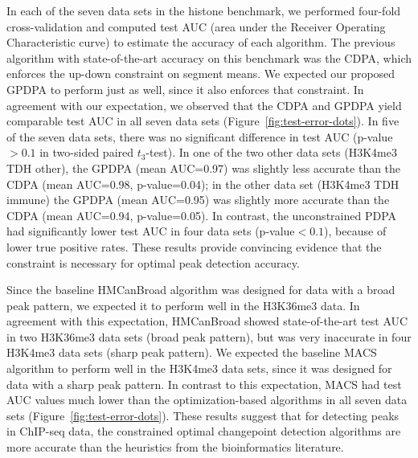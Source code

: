 \documentclass[twoside,11pt]{article}
\begin{document}
In each of the seven data sets in the histone benchmark,
we performed four-fold cross-validation and computed test AUC (area
under the Receiver Operating Characteristic curve) to estimate the
accuracy of each algorithm. The previous algorithm with
state-of-the-art accuracy on this benchmark was the CDPA, which
enforces the up-down constraint on segment means. We expected our
proposed GPDPA to perform just as well, since it also enforces that
constraint. In agreement with our expectation, we observed that the
CDPA and GPDPA yield comparable test AUC in all seven data sets
(Figure~\ref{fig:test-error-dots}). In five of the seven data sets,
there was no significant difference in test AUC (p-value$>0.1$ in
two-sided paired $t_3$-test). In one of the two other data sets
(H3K4me3 TDH other), the GPDPA (mean AUC=0.97) was slightly less
accurate than the CDPA (mean AUC=0.98, p-value=0.04); in the other
data set (H3K4me3 TDH immune) the GPDPA (mean AUC=0.95) was slightly
more accurate than the CDPA (mean AUC=0.94, p-value=0.05). In contrast, the
unconstrained PDPA had significantly lower test AUC in four data sets
(p-value$<0.1$), because of lower true positive rates. These results
provide convincing evidence that the constraint is necessary for
optimal peak detection accuracy.

Since the baseline HMCanBroad algorithm was designed for data with a
broad peak pattern, we expected it to perform well in the H3K36me3
data. In agreement with this expectation, HMCanBroad showed
state-of-the-art test AUC in two H3K36me3 data sets (broad peak
pattern), but was very inaccurate in four H3K4me3 data sets (sharp
peak pattern). We expected the baseline MACS algorithm to perform well
in the H3K4me3 data sets, since it was designed for data with a sharp
peak pattern. In contrast to this expectation, MACS had test AUC
values much lower than the optimization-based algorithms in all seven
data sets (Figure~\ref{fig:test-error-dots}). These results suggest
that for detecting peaks in ChIP-seq data, the constrained optimal
changepoint detection algorithms are more accurate than the heuristics
from the bioinformatics literature.


%   
\end{document}

